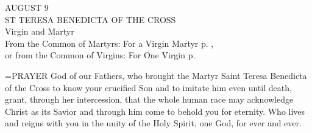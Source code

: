 \begin{center}\normalsize AUGUST 9\\
\footnotesize ST TERESA BENEDICTA OF THE CROSS\\
\footnotesize Virgin and Martyr\\
\footnotesize From the Common of Martyrs: For a Virgin Martyr p.    , \\
\footnotesize or from the Common of Virgins: For One Virgin  p.\\
\end{center}

\hangindent=\parindent \small{PRAYER 
God of our Fathers,
who brought the Martyr Saint Teresa Benedicta of the Cross
to know your crucified Son
and to imitate him even until death,
grant, through her intercession,
that the whole human race may acknowledge Christ as its Savior
and through him come to behold you for eternity.
Who lives and reigns with you in the unity of the Holy Spirit,
one God, for ever and ever.\\}
 
